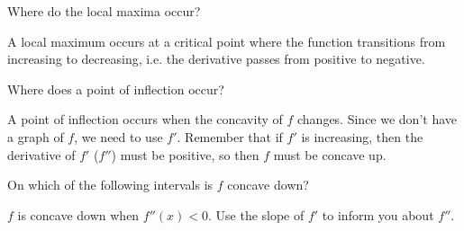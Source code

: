 \documentclass{ximera}
\begin{document}
\begin{example}
  \begin{problem}
    Where do the local maxima occur?
    \begin{selectAll}
    \end{selectAll}
    \begin{hint}
      A local maximum occurs at a critical point where the function
      transitions from increasing to decreasing, i.e. the derivative
      passes from positive to negative. %
    \end{hint}
  \end{problem}
  
  \begin{problem}
    Where does a point of inflection occur?
    \begin{selectAll}
\end{selectAll}
    
    \begin{hint}
      A point of inflection occurs when the concavity of $f$ changes. Since we don't have a graph of $f$, we need to use $f'$.  Remember that if $f'$ is increasing, then the derivative of $f'$ ($f''$) must be positive, so then $f$ must be concave up. %
    \end{hint}
    
  \end{problem}

  \begin{problem}
    On which of the following intervals is $f$ concave down?
    \begin{selectAll}
    \end{selectAll}
    
    \begin{hint}
      $f$ is concave down when $f''(x)<0$.  Use the slope of $f'$ to inform you about $f''$.%
    \end{hint}
  \end{problem}
  
  
\end{example}
\end{document}
